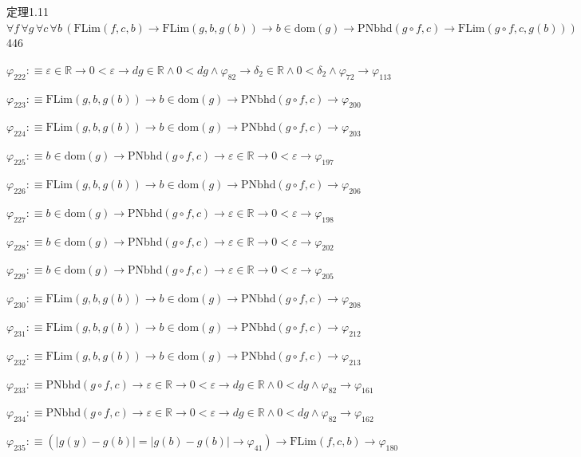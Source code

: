 \begin{fullproof}{定理1.11}{$\forall f\,\forall g\,\forall c\,\forall b\,(\mathrm{FLim}(f,c,b) \to \mathrm{FLim}(g,b,g(b)) \to b \in \mathrm{dom}(g) \to \mathrm{PNbhd}(g \circ f,c) \to \mathrm{FLim}(g \circ f,c,g(b)))$}{446}
\begin{abbrevlist}
\item $\varphi_{222} :\equiv \varepsilon \in \mathbb{R} \to 0 < \varepsilon \to \mathit{dg} \in \mathbb{R} \land 0 < \mathit{dg} \land \varphi_{82} \to \delta_{2} \in \mathbb{R} \land 0 < \delta_{2} \land \varphi_{72} \to \varphi_{113}$
\item $\varphi_{223} :\equiv \mathrm{FLim}(g,b,g(b)) \to b \in \mathrm{dom}(g) \to \mathrm{PNbhd}(g \circ f,c) \to \varphi_{200}$
\item $\varphi_{224} :\equiv \mathrm{FLim}(g,b,g(b)) \to b \in \mathrm{dom}(g) \to \mathrm{PNbhd}(g \circ f,c) \to \varphi_{203}$
\item $\varphi_{225} :\equiv b \in \mathrm{dom}(g) \to \mathrm{PNbhd}(g \circ f,c) \to \varepsilon \in \mathbb{R} \to 0 < \varepsilon \to \varphi_{197}$
\item $\varphi_{226} :\equiv \mathrm{FLim}(g,b,g(b)) \to b \in \mathrm{dom}(g) \to \mathrm{PNbhd}(g \circ f,c) \to \varphi_{206}$
\item $\varphi_{227} :\equiv b \in \mathrm{dom}(g) \to \mathrm{PNbhd}(g \circ f,c) \to \varepsilon \in \mathbb{R} \to 0 < \varepsilon \to \varphi_{198}$
\item $\varphi_{228} :\equiv b \in \mathrm{dom}(g) \to \mathrm{PNbhd}(g \circ f,c) \to \varepsilon \in \mathbb{R} \to 0 < \varepsilon \to \varphi_{202}$
\item $\varphi_{229} :\equiv b \in \mathrm{dom}(g) \to \mathrm{PNbhd}(g \circ f,c) \to \varepsilon \in \mathbb{R} \to 0 < \varepsilon \to \varphi_{205}$
\item $\varphi_{230} :\equiv \mathrm{FLim}(g,b,g(b)) \to b \in \mathrm{dom}(g) \to \mathrm{PNbhd}(g \circ f,c) \to \varphi_{208}$
\item $\varphi_{231} :\equiv \mathrm{FLim}(g,b,g(b)) \to b \in \mathrm{dom}(g) \to \mathrm{PNbhd}(g \circ f,c) \to \varphi_{212}$
\item $\varphi_{232} :\equiv \mathrm{FLim}(g,b,g(b)) \to b \in \mathrm{dom}(g) \to \mathrm{PNbhd}(g \circ f,c) \to \varphi_{213}$
\item $\varphi_{233} :\equiv \mathrm{PNbhd}(g \circ f,c) \to \varepsilon \in \mathbb{R} \to 0 < \varepsilon \to \mathit{dg} \in \mathbb{R} \land 0 < \mathit{dg} \land \varphi_{82} \to \varphi_{161}$
\item $\varphi_{234} :\equiv \mathrm{PNbhd}(g \circ f,c) \to \varepsilon \in \mathbb{R} \to 0 < \varepsilon \to \mathit{dg} \in \mathbb{R} \land 0 < \mathit{dg} \land \varphi_{82} \to \varphi_{162}$
\item $\varphi_{235} :\equiv (\lvert g(y) - g(b) \rvert = \lvert g(b) - g(b) \rvert \to \varphi_{41}) \to \mathrm{FLim}(f,c,b) \to \varphi_{180}$

\end{abbrevlist}
\end{fullproof}
